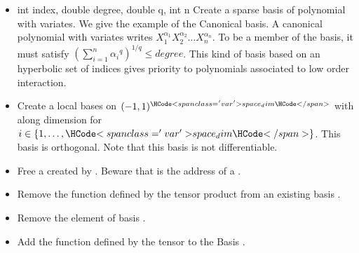 \begin{itemize}
\item  {}
  {int index, double degree, double q, int n}
  \sshortdescribe Create a sparse basis of polynomial with 
  variates. We give the example of the Canonical basis. A canonical polynomial
  with  variates writes $X_1^{\alpha_1} X_2^{\alpha_2} \dots
  X_n^{\alpha_n}$. To be a member of the basis, it must satisfy $\left(\sum_{i=1}^n
    {\alpha_i}^q \right)^{1/q} \leq degree$. This kind of basis based on an
  hyperbolic set of indices gives priority to polynomials associated to low
  order interaction.

\item {}
  \sshortdescribe Create a local bases on $(-1, 1)^{\var{space_dim}}$ with  along dimension  for $i \in \{1,\dots,\var{space_dim}\}$. This basis is orthogonal. Note that this basis is not differentiable.

\item  {}
  \sshortdescribe Free a \PnlBasis created by
  . Beware that  is the address of a
  \PnlBasis\ptr.


\item {}
  \sshortdescribe Remove the function defined by the tensor product  from
  an existing basis .

\item {}
  \sshortdescribe Remove the  element of basis .

\item {}
  \sshortdescribe Add the function defined by the tensor  to the Basis .


\end{itemize}


